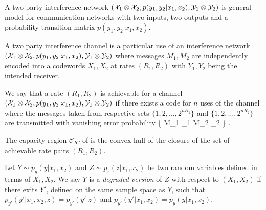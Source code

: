 \documentclass[aps,11pt,twoside,letterpaper]{article}
\newcommand{\ICcap}{  \ensuremath{\mathcal C}_{IC} }
\begin{document}
        \begin{definition}
            A two party interference network $({\cal X}_1 \otimes {\cal X}_2, p(y_1,y_2|x_1,x_2), {\cal Y}_1 \otimes {\cal Y}_2)$ 
            is general model for communication networks with two inputs, two outputs and a probability transition
            matrix $p(y_1,y_2|x_1,x_2)$.
        \end{definition}
        

        \begin{definition}
            A two party interference channel is a particular use of an interference network 
            $({\cal X}_1 \otimes {\cal X}_2, p(y_1,y_2|x_1,x_2), {\cal Y}_1 \otimes {\cal Y}_2)$ 
            where messages $M_1,M_2$ are independently encoded into a codewords $X_1,X_2$ 
            at rates $(R_1,R_2)$ with $Y_1,Y_2$ being the intended receiver.
        \end{definition}

        \begin{definition}   \label{def:achievableICrates}
            We say that a rate $(R_1,R_2)$ is achievable for a channel 
            $({\cal X}_1 \otimes {\cal X}_2, p(y_1,y_2|x_1,x_2), {\cal Y}_1 \otimes {\cal Y}_2)$
            if there exists a code for $n$ uses of the channel where the messages 
            taken from respective sets $\{1,2,\ldots,2^{nR_1} \}$ and
             $\{1,2,\ldots,2^{nR_2} \}$ are transmitted with vanishing error probability
             \be
             	\Pr\left\{ M_1 \neq {}_1   M_2 \neq {}_2 \right\} \leq \epsilon.
		\label{eqn:ICerrors}
             \ee
        \end{definition}
        
        \begin{definition}[Capacity]
            The capacity region $\ICcap$ of is the convex hull of the closure of the set of achievable rate pairs $(R_1,R_2)$.
        \end{definition}


        \begin{definition} \label{def:degraded-channel}
            Let $Y \sim p_y(y|x_1,x_2)$ and $Z \sim p_z(z|x_1,x_2)$ be two random variables 
            defined in terms of $X_1,X_2$.
            We say $Y$ is a \emph{degraded version} of $Z$ with respect to $(X_1,X_2)$ if
            there exits $Y'$, defined on the same sample space as $Y$, such that 
            $p_{y'}(y'|x_1,x_2,z)=p_{y'}(y'|z)$ and $p_{y'}(y'|x_1,x_2) = p_y(y|x_1,x_2)$.
        \end{definition}
        
\end{document}

